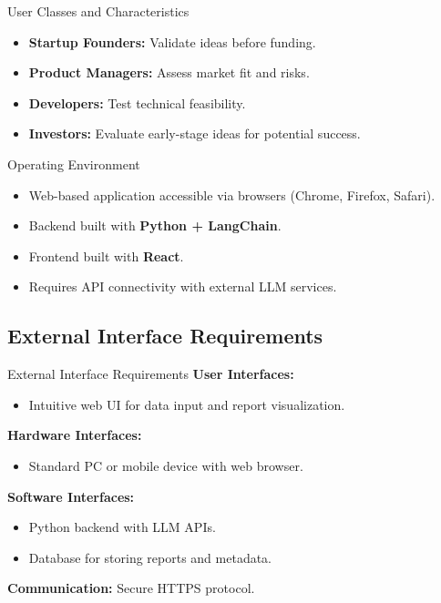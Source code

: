 \documentclass{beamer}
\begin{document}
\begin{frame}{User Classes and Characteristics}
    \begin{itemize}
        \item \textbf{Startup Founders:} Validate ideas before funding.
        \item \textbf{Product Managers:} Assess market fit and risks.
        \item \textbf{Developers:} Test technical feasibility.
        \item \textbf{Investors:} Evaluate early-stage ideas for potential success.
    \end{itemize}
\end{frame}

\begin{frame}{Operating Environment}
    \begin{itemize}
        \item Web-based application accessible via browsers (Chrome, Firefox, Safari).
        \item Backend built with \textbf{Python + LangChain}.
        \item Frontend built with \textbf{React}.
        \item Requires API connectivity with external LLM services.
    \end{itemize}
\end{frame}

\subsection{External Interface Requirements}
\begin{frame}{External Interface Requirements}
    \textbf{User Interfaces:}
    \begin{itemize}
        \item Intuitive web UI for data input and report visualization.
    \end{itemize}
    \vspace{4pt}
    \textbf{Hardware Interfaces:}
    \begin{itemize}
        \item Standard PC or mobile device with web browser.
    \end{itemize}
    \vspace{4pt}
    \textbf{Software Interfaces:}
    \begin{itemize}
        \item Python backend with LLM APIs.
        \item Database for storing reports and metadata.
    \end{itemize}
    \vspace{4pt}
    \textbf{Communication:} Secure HTTPS protocol.
\end{frame}
\end{document}
